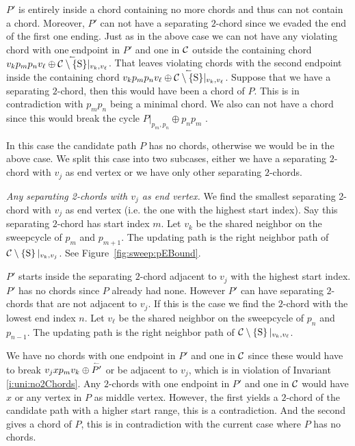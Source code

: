       $P'$ is entirely inside a chord containing no more chords and thus can not contain a chord. Moreover, $P'$ can not have a separating $2$-chord since we evaded the end of the first one ending.
      Just as in the above case we can not have any violating chord with one endpoint in $P'$ and one in $\mathcal{C}$ outside the containing chord $v_k p_m p_n v_\ell \oplus \accentset{\leftharpoonup}{\mathcal{C}\setminus \left\lbrace {\mathrm{S}} \right\rbrace} |_{v_k, v_\ell}$.
      That leaves violating chords with the second endpoint inside the containing chord $v_k p_m p_n v_\ell \oplus \accentset{\leftharpoonup}{\mathcal{C}\setminus \left\lbrace {\mathrm{S}} \right\rbrace} |_{v_k, v_\ell}$.
      Suppose that we have a separating $2$-chord, then this would have been a chord of $P$. This is in contradiction with $p_m p_n$ being a minimal chord.
      We also can not have a chord since this would break the cycle $P|_{p_m, p_n} \oplus p_n p_m$ .

    In this case the candidate path $P$ has no chords, otherwise we would be in the above case. We split this case into two subcases, either we have a separating $2$-chord with $v_j$ as end vertex or we have only other separating $2$-chords.

    \emph{Any separating 2-chords with $v_j$ as end vertex.}
      We find the smallest separating 2-chord with $v_j$ as end vertex (i.e. the one with the highest start index). Say this separating $2$-chord has start index $m$.
      Let $v_k$ be the shared neighbor on the sweepcycle of $p_{m}$ and $p_{m +1}$. The updating path is the right neighbor path of $\mathcal{C} \setminus \left\lbrace {\mathrm{S}} \right\rbrace|_{v_k, v_j}$. See Figure~\ref{fig:sweep:pEBound}.

      $P'$ starts inside the separating $2$-chord adjacent to $v_j$ with the highest start index. $P'$ has no chords since $P$ already had none.
      However $P'$ can have separating $2$-chords that are not adjacent to $v_j$.
      If this is the case we find the $2$-chord with the lowest end index $n$.
      Let $v_\ell$ be the shared neighbor on the sweepcycle of $p_{n}$ and $p_{n-1}$.
      The updating path is the right neighbor path of $\mathcal{C} \setminus \left\lbrace {\mathrm{S}} \right\rbrace|_{v_k, v_\ell}$.

      We have no chords with one endpoint in $P'$ and one in $\mathcal{C}$ since these would have to break $v_j x p_m v_k \oplus \accentset{\leftharpoonup}{P'}$ or be adjacent to $v_j$, which is in violation of Invariant \ref{i:uni:no2Chords}.
      Any $2$-chords with one endpoint in $P'$ and one in $\mathcal{C}$ would have $x$ or any vertex in $P$ as middle vertex.
      However, the first yields a $2$-chord of the candidate path with a higher start range, this is a contradiction.
      And the second gives a chord of $P$, this is in contradiction with the current case where $P$ has no chords.


